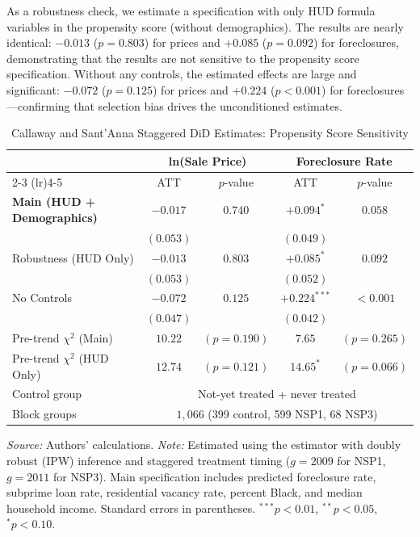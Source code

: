 \documentclass[12pt,authoryear]{elsarticle}
\begin{document}
As a robustness check, we estimate a specification with only HUD formula variables in the propensity score (without demographics). The results are nearly identical: $-0.013$ ($p = 0.803$) for prices and $+0.085$ ($p = 0.092$) for foreclosures, demonstrating that the results are not sensitive to the propensity score specification. Without any controls, the estimated effects are large and significant: $-0.072$ ($p = 0.125$) for prices and $+0.224$ ($p < 0.001$) for foreclosures---confirming that selection bias drives the unconditioned estimates.

\begin{table}[htbp]
\centering
\caption{Callaway and Sant'Anna Staggered DiD Estimates: Propensity Score Sensitivity}
\label{tab:main_results}
\begin{threeparttable}
\begin{tabular}{lcccc}
\toprule
& \multicolumn{2}{c}{ln(Sale Price)} & \multicolumn{2}{c}{Foreclosure Rate} \\
\cmidrule(lr){2-3} \cmidrule(lr){4-5}
& ATT & $p$-value & ATT & $p$-value \\
\midrule
\textbf{Main (HUD + Demographics)} & $-0.017$ & $0.740$ & $+0.094^{*}$ & $0.058$ \\
& $(0.053)$ & & $(0.049)$ & \\
\addlinespace
Robustness (HUD Only) & $-0.013$ & $0.803$ & $+0.085^{*}$ & $0.092$ \\
& $(0.053)$ & & $(0.052)$ & \\
\addlinespace
No Controls & $-0.072$ & $0.125$ & $+0.224^{***}$ & $<0.001$ \\
& $(0.047)$ & & $(0.042)$ & \\
\addlinespace
\midrule
Pre-trend $\chi^2$ (Main) & $10.22$ & $(p = 0.190)$ & $7.65$ & $(p = 0.265)$ \\
Pre-trend $\chi^2$ (HUD Only) & $12.74$ & $(p = 0.121)$ & $14.65^{*}$ & $(p = 0.066)$ \\
\addlinespace
Control group & \multicolumn{4}{c}{Not-yet treated + never treated} \\
Block groups & \multicolumn{4}{c}{$1{,}066$ (399 control, 599 NSP1, 68 NSP3)} \\
\bottomrule
\end{tabular}
\begin{tablenotes}[flushleft]
\footnotesize
\item \textit{Source:} Authors' calculations. \textit{Note:} Estimated using the \citet{callaway2021} estimator with doubly robust (IPW) inference and staggered treatment timing ($g = 2009$ for NSP1, $g = 2011$ for NSP3). Main specification includes predicted foreclosure rate, subprime loan rate, residential vacancy rate, percent Black, and median household income. Standard errors in parentheses. $^{***} p < 0.01$, $^{**} p < 0.05$, $^{*} p < 0.10$.
\end{tablenotes}
\end{threeparttable}
\end{table}
\end{document}
